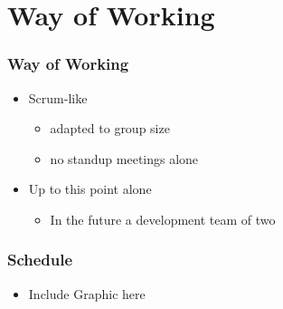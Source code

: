 \section{Way of Working}
\begin{frame}\frametitle{Way of Working}
	\begin{itemize}
		\item Scrum-like
		\begin{itemize}
			\item adapted to group size
			\item no standup meetings alone
		\end{itemize}
		\item Up to this point alone
		\begin{itemize}
			\item In the future a development team of two
		\end{itemize}
	\end{itemize}
\end{frame}
\begin{frame}\frametitle{Schedule}
	\begin{itemize}
		\item Include Graphic here
	\end{itemize}
\end{frame}